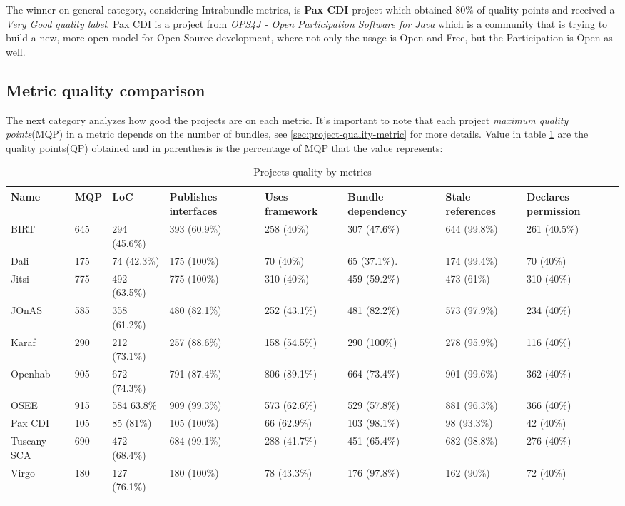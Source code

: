 The winner on general category, considering Intrabundle metrics, is \textbf{Pax CDI} project which obtained 80\% of quality points and received a \emph{Very Good quality label}. Pax CDI is a project from \emph{OPS4J - Open Participation Software for Java} which is a community that is trying to build a new, more open model for Open Source development, where not only the usage is Open and Free, but the Participation is Open as well. 

\subsection{Metric quality comparison}

The next category analyzes how good the projects are on each metric. It's important to note that each project \emph{maximum quality points}(MQP) in a metric depends on the number of bundles, see \ref{sec:project-quality-metric} for more details. Value in table \ref{projects-metrics-quality} are the quality points(QP) obtained and in parenthesis is the percentage of MQP that the value represents:  

\begin{table}[h]
\tiny
\caption{Projects quality by metrics}
\label{projects-metrics-quality}
    \begin{tabular}{  p{3cm} | p{2cm} | p{2cm} | p{2cm} | p{2cm} | p{2cm} | p{2cm} | p{2cm} }
    \Xhline{2\arrayrulewidth}
    Name & MQP & LoC & Publishes interfaces & Uses framework & Bundle dependency & Stale references & Declares permission \\  \hline
    BIRT & 645 & 294 (45.6\%) & 393 (60.9\%) & 258 (40\%) & 307 (47.6\%) & 644 (99.8\%) & 261 (40.5\%)\\ \hline
    Dali & 175 & 74 (42.3\%) & 175 (100\%) & 70 (40\%) & 65 (37.1\%). & 174 (99.4\%) & 70 (40\%)\\ \hline
    Jitsi & 775 & 492 (63.5\%) & 775 (100\%) & 310 (40\%) & 459 (59.2\%) & 473 (61\%) & 310 (40\%)\\ \hline
    JOnAS & 585 & 358 (61.2\%) & 480 (82.1\%) & 252 (43.1\%) & 481 (82.2\%) & 573 (97.9\%) & 234 (40\%)\\ \hline
    Karaf & 290 & 212 (73.1\%) & 257 (88.6\%) & 158 (54.5\%) &  290 (100\%) & 278 (95.9\%) & 116 (40\%)\\ \hline
    Openhab & 905 & 672 (74.3\%)& 791 (87.4\%) & 806 (89.1\%)&  664 (73.4\%) & 901 (99.6\%) & 362 (40\%)\\ \hline
    OSEE & 915 & 584 63.8\% & 909 (99.3\%) & 573 (62.6\%) & 529 (57.8\%) & 881 (96.3\%) & 366 (40\%)\\ \hline
    Pax CDI & 105 & 85 (81\%) & 105 (100\%) & 66 (62.9\%) & 103 (98.1\%) & 98 (93.3\%) & 42 (40\%) \\ \hline
    Tuscany SCA & 690 & 472 (68.4\%) & 684 (99.1\%) & 288 (41.7\%) & 451 (65.4\%) &  682 (98.8\%) & 276 (40\%) \\ \hline
    Virgo & 180 & 127 (76.1\%) & 180 (100\%) & 78 (43.3\%) & 176 (97.8\%) & 162 (90\%) & 72 (40\%)\\
   \Xhline{2\arrayrulewidth}
    \end{tabular}
\end{table}
\FloatBarrier   

